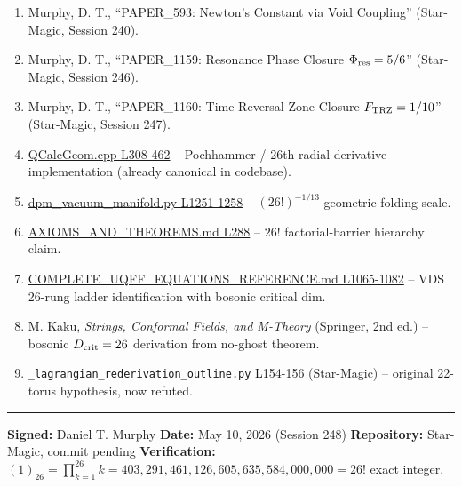\documentclass[
]{article}
\providecommand{\tightlist}{%
  \setlength{\itemsep}{0pt}\setlength{\parskip}{0pt}}
\begin{document}
\begin{enumerate}
\def\labelenumi{\arabic{enumi}.}
\tightlist
\item
  Murphy, D. T., ``PAPER\_593: Newton's Constant via Void Coupling''
  (Star-Magic, Session 240).
\item
  Murphy, D. T., ``PAPER\_1159: Resonance Phase Closure
  \(\Phi_{\rm res}=5/6\)'' (Star-Magic, Session 246).
\item
  Murphy, D. T., ``PAPER\_1160: Time-Reversal Zone Closure
  \(F_{\rm TRZ}=1/10\)'' (Star-Magic, Session 247).
\item
  \href{QCalcGeom.cpp\#L308}{QCalcGeom.cpp L308-462} -- Pochhammer /
  26th radial derivative implementation (already canonical in codebase).
\item
  \href{dpm_vacuum_manifold.py\#L1251}{dpm\_vacuum\_manifold.py
  L1251-1258} -- \((26!)^{-1/13}\) geometric folding scale.
\item
  \href{AXIOMS_AND_THEOREMS.md\#L288}{AXIOMS\_AND\_THEOREMS.md L288} --
  \(26!\) factorial-barrier hierarchy claim.
\item
  \href{COMPLETE_UQFF_EQUATIONS_REFERENCE.md\#L1065}{COMPLETE\_UQFF\_EQUATIONS\_REFERENCE.md
  L1065-1082} -- VDS 26-rung ladder identification with bosonic critical
  dim.
\item
  M. Kaku, \emph{Strings, Conformal Fields, and M-Theory} (Springer, 2nd
  ed.) -- bosonic \(D_{\rm crit}=26\) derivation from no-ghost theorem.
\item
  \texttt{\_lagrangian\_rederivation\_outline.py} L154-156 (Star-Magic)
  -- original 22-torus hypothesis, now refuted.
\end{enumerate}

\begin{center}\rule{0.5\linewidth}{0.5pt}\end{center}

\textbf{Signed:} Daniel T. Murphy \textbf{Date:} May 10, 2026 (Session
248) \textbf{Repository:} Star-Magic, commit pending
\textbf{Verification:}
\((1)_{26} = \prod_{k=1}^{26} k = 403{,}291{,}461{,}126{,}605{,}635{,}584{,}000{,}000 = 26!\)
exact integer.
\end{document}
